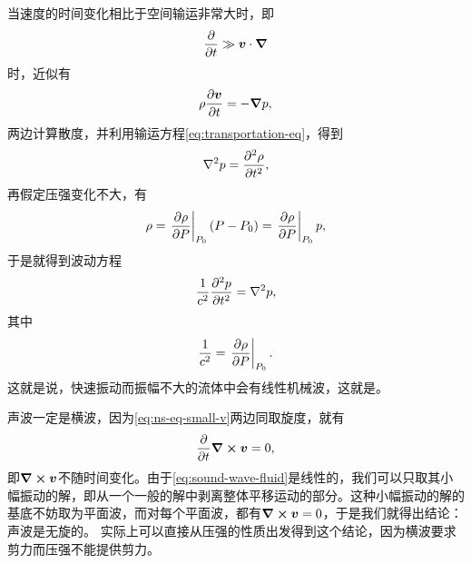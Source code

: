 当速度的时间变化相比于空间输运非常大时，即
\[
    \pdv{t} \gg \vb*{v} \cdot \grad
\]
时，近似有
\begin{equation}
    \rho \pdv{\vb*{v}}{t} = - \grad{p},
    \label{eq:ns-eq-small-v}
\end{equation}
两边计算散度，并利用输运方程\eqref{eq:transportation-eq}，得到
\[
    \laplacian{p} = \pdv[2]{\rho}{t},
\]
再假定压强变化不大，有
\[
    \rho = \eval{\pdv{\rho}{P}}_{P_0} (P - P_0) = \eval{\pdv{\rho}{P}}_{P_0} p,
\]
于是就得到波动方程
\begin{equation}
    \frac{1}{c^2} \pdv[2]{p}{t} = \laplacian{p},
    \label{eq:sound-wave-fluid}
\end{equation}
其中
\begin{equation}
    \frac{1}{c^2} = \eval{\pdv{\rho}{P}}_{P_0}.
\end{equation}
这就是说，快速振动而振幅不大的流体中会有线性机械波，这就是。

声波一定是横波，因为\eqref{eq:ns-eq-small-v}两边同取旋度，就有
\[
    \pdv{t} \curl{\vb*{v}} = 0, 
\]
即$\curl{\vb*{v}}$不随时间变化。由于\eqref{eq:sound-wave-fluid}是线性的，我们可以只取其小幅振动的解，即从一个一般的解中剥离整体平移运动的部分。这种小幅振动的解的基底不妨取为平面波，而对每个平面波，都有$\curl{\vb*{v}}=0$，于是我们就得出结论：声波是无旋的。
实际上可以直接从压强的性质出发得到这个结论，因为横波要求剪力而压强不能提供剪力。